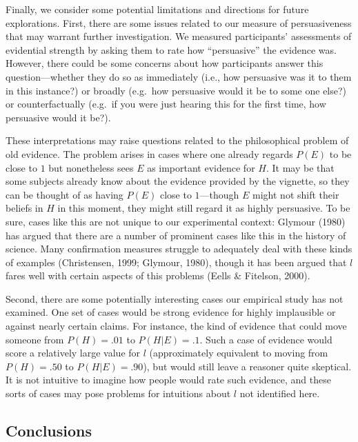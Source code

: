 \documentclass[10pt, letterpaper]{article}
\begin{document}
Finally, we consider some potential limitations and directions for
future explorations. First, there are some issues related to our measure
of persuasiveness that may warrant further investigation. We measured
participants' assessments of evidential strength by asking them to rate
how ``persuasive'' the evidence was. However, there could be some
concerns about how participants answer this question---whether they do
so as immediately (i.e., how persuasive was it to them in this
instance?) or broadly (e.g.~how persuasive would it be to some one
else?) or counterfactually (e.g.~if you were just hearing this for the
first time, how persuasive would it be?).

These interpretations may raise questions related to the philosophical
problem of old evidence. The problem arises in cases where one already
regards \(P(E)\) to be close to \(1\) but nonetheless sees \(E\) as
important evidence for \(H\). It may be that some subjects already know
about the evidence provided by the vignette, so they can be thought of
as having \(P(E)\) close to \(1\)---though \(E\) might not shift their
beliefs in \(H\) in this moment, they might still regard it as highly
persuasive. To be sure, cases like this are not unique to our
experimental context: Glymour (1980) has argued that there are a number
of prominent cases like this in the history of science. Many
confirmation measures struggle to adequately deal with these kinds of
examples (Christensen, 1999; Glymour, 1980), though it has been argued
that \(l\) fares well with certain aspects of this problems (Eells \&
Fitelson, 2000).

Second, there are some potentially interesting cases our empirical study
has not examined. One set of cases would be strong evidence for highly
implausible or against nearly certain claims. For instance, the kind of
evidence that could move someone from \(P(H) = .01\) to \(P(H|E) = .1\).
Such a case of evidence would score a relatively large value for \(l\)
(approximately equivalent to moving from \(P(H) = .50\) to
\(P(H|E) = .90\)), but would still leave a reasoner quite skeptical. It
is not intuitive to imagine how people would rate such evidence, and
these sorts of cases may pose problems for intuitions about \(l\) not
identified here.

\hypertarget{conclusions}{%
\subsection{Conclusions}\label{conclusions}}
\end{document}
